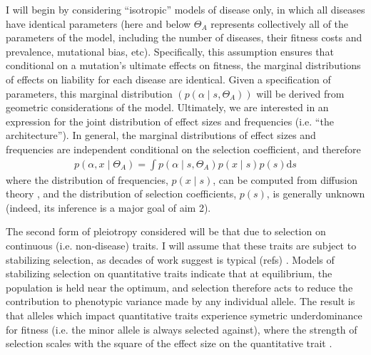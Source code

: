 \documentclass[11pt]{article}
\newcommand{\jb}[1]{{\color{blue} (#1)} }
\begin{document}
I will begin by considering ``isotropic'' models of disease only, in which all diseases have identical parameters (here and below $\Theta_A$ represents collectively all of the parameters of the model, including the number of diseases, their fitness costs and prevalence, mutational bias, etc). Specifically, this assumption ensures that conditional on a mutation's ultimate effects on fitness, the marginal distributions of effects on liability for each disease are identical. Given a specification of parameters, this marginal distribution $(p\left(\alpha \mid s,\Theta_A\right))$ will be derived from geometric considerations of the model. Ultimately, we are interested in an expression for the joint distribution of effect sizes and frequencies (i.e. ``the architecture''). In general, the marginal distributions of effect sizes and frequencies are independent conditional on the selection coefficient, and therefore
\begin{align}
  p\left(\alpha,x \mid \Theta_A\right) = \int p\left(\alpha \mid s,\Theta_A\right) p\left(x \mid s \right) p\left(s\right)\mathrm{d}s
  \label{exp-for-arch}
\end{align}
where the distribution of frequencies, $p\left(x \mid s \right)$, can be computed from diffusion theory \cite{Ewens}, and the distribution of selection coefficients, $p\left(s\right)$, is generally unknown (indeed, its inference is a major goal of aim 2).

The second form of pleiotropy considered will be that due to selection on continuous (i.e. non-disease) traits. I will assume that these traits are subject to stabilizing selection, as decades of work suggest is typical \jb{refs}. Models of stabilizing selection on quantitative traits indicate that at equilibrium, the population is held near the optimum, and selection therefore acts to reduce the contribution to phenotypic variance made by any individual allele. The result is that alleles which impact quantitative traits experience symetric underdominance for fitness (i.e. the minor allele is always selected against), where the strength of selection scales with the square of the effect size on the quantitative trait \cite{Robertson:1956dk}.
\end{document}

